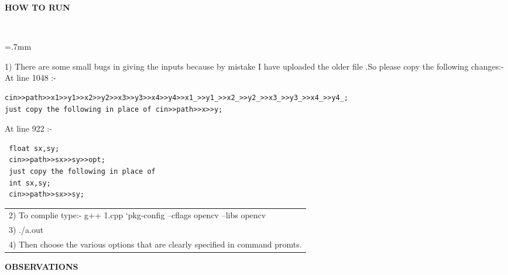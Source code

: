 \documentclass[11pt,a4paper,sans]{moderncv}        %
\newcommand{\lsep}{-0.5cm}
\newcommand{\resheading}[1]{{\small \colorbox{mygrey}{\begin{minipage}{0.975\textwidth}{\textbf{#1 \vphantom{p\^{E}}}}\end{minipage}}}}
\begin{document}
\makecvtitle

\resheading{\textbf{{\selectfont HOW TO RUN}} }\\[\lsep]
\vspace{4pt}

\tabulinesep=.7mm
\indent

1) There are some small bugs in giving the inputs because by mistake I have uploaded the older file .So please copy the following changes:-
At line 1048 :- 
\begin{lstlisting}
cin>>path>>x1>>y1>>x2>>y2>>x3>>y3>>x4>>y4>>x1_>>y1_>>x2_>>y2_>>x3_>>y3_>>x4_>>y4_;
just copy the following in place of cin>>path>>x>>y;
\end{lstlisting}
At line 922 :-
\begin{lstlisting}
 float sx,sy;
 cin>>path>>sx>>sy>>opt;
 just copy the following in place of 	
 int sx,sy;
 cin>>path>>sx>>sy;
\end{lstlisting}		

\begin{tabu}{ *1{X[-2,l,m] }}
\\

2) To complie type:-   g++ 1.cpp  `pkg-config --cflags opencv --libs opencv \\
3) ./a.out  \\
4) Then choose the various options that are clearly specified in command promts.\\
  \hline
\end{tabu}

\vspace{8pt}
 \resheading{\textbf{{\selectfont OBSERVATIONS }} }\\ [\lsep]\vspace{6pt}
\end{document}
